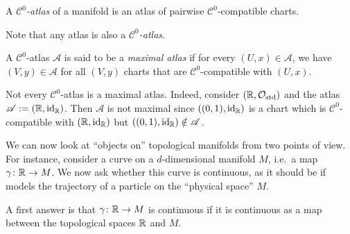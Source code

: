 \bd
A \emph{$\mathcal{C}^0$-atlas} of a manifold is an atlas of pairwise $\mathcal{C}^0$-compatible charts.
\ed

Note that any atlas is also a \emph{$\mathcal{C}^0$-atlas}.

\bd
A $\mathcal{C}^0$-atlas $\mathscr{A}$ is said to be a \emph{maximal atlas} if for every $(U,x)\in\mathscr{A}$, we have $(V,y)\in\mathscr{A}$ for all $(V,y)$ charts that are $\mathcal{C}^0$-compatible with $(U,x)$.
\ed

\be
Not every $\mathcal{C}^0$-atlas is a maximal atlas. Indeed, consider $(\mathbb{R},\mathcal{O}_\mathrm{std})$ and the atlas $\mathscr{A}:=(\mathbb{R},\operatorname{id}_{\mathbb{R}})$. Then $\mathscr{A}$ is not maximal since $((0,1),\operatorname{id}_{\mathbb{R}})$ is a chart which is $\mathcal{C}^0$-compatible with $(\mathbb{R},\operatorname{id}_{\mathbb{R}})$ but $((0,1),\operatorname{id}_{\mathbb{R}}) \notin \mathscr{A}$.
\ee

We can now look at ``objects on'' topological manifolds from two points of view. For instance, consider a curve on a $d$-dimensional manifold $M$, i.e.\ a map $\gamma\colon \mathbb{R}\to M$. We now ask whether this curve is continuous, as it should be if models the trajectory of a particle on the ``physical space'' $M$.

A first answer is that $\gamma\colon \mathbb{R} \to M$ is continuous if it is continuous as a map between the topological spaces $\mathbb{R}$ and $M$.

